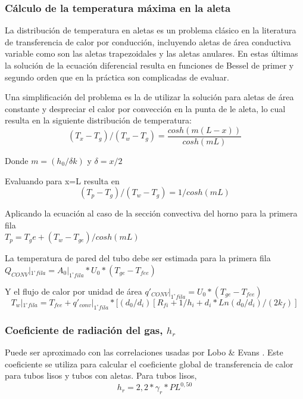 \subsubsection{Cálculo de la temperatura máxima en la aleta}
\par La distribución de temperatura en aletas es un problema clásico en la
literatura de transferencia de calor por conducción, incluyendo aletas de área conductiva variable como son las aletas trapezoidales y las aletas anulares. En estas últimas la solución de la ecuación diferencial resulta en funciones de Bessel de primer y segundo orden que en la práctica son complicadas de evaluar.
\par Una simplificación del problema es la de utilizar la solución para aletas de área constante y despreciar el calor por convección en la punta de le aleta, lo cual resulta en la siguiente distribución de temperatura:
\begin{equation}
(T_x -T_g )/(T_w - T_g) = \frac{cosh(m(L-x))}{cosh(mL)}
\end{equation}
\par Donde $m = (h_0 / \delta k)$ y $\delta = x/2$
\par Evaluando para x=L resulta en
\begin{equation}
(T_p - T_g )/(T_w -T_g ) = 1 / cosh(mL)
\end{equation}
\par Aplicando la ecuación al caso de la sección convectiva del horno para la primera fila \\
$T_p = T_ge + (T_w -T_{ge}) / cosh(mL)$
\par La temperatura de pared del tubo debe ser estimada para la primera fila $Q_{CONV}|_{1^{\circ} fila} = A_0|_{1^{\circ} fila} *U_0 *
(T_{ge} - T_{fee})$
\par Y el flujo de calor por unidad de área $q\prime_{CONV}|_{1^{\circ} fila} = U_0 * (T_{ge} - T_{fee})$
\begin{equation}
T_w|_{1^{\circ} fila} = T_{fee} + q\prime_{conv}|_{1^{\circ} fila} *
[(d_0 /d_i ) [ R_{fi} + 1/h_i + d_i*Ln(d_0 /d_i)/(2k_f)]
\end{equation}

\subsubsection{Coeficiente de radiación del gas, $h_r$}
\par Puede ser aproximado con las correlaciones usadas por Lobo \& Evans \cite{bib:rad}. Este coeficiente se utiliza para calcular el coeficiente global de transferencia de calor para tubos lisos y tubos con aletas. 
Para tubos lisos,
\begin{equation}
h_r = 2,2 *\gamma_r *PL^{0,50}
\end{equation}

